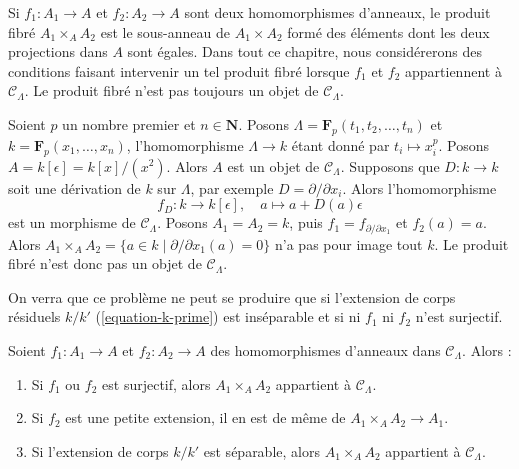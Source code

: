\noindent
Si $f_1: A_1 \to A$ et $f_2: A_2 \to A$ sont deux homomorphismes d'anneaux,
le produit fibré $A_1 \times_A A_2$ est le sous-anneau de $A_1 \times A_2$
formé des éléments dont les deux projections dans $A$ sont égales. Dans tout
ce chapitre, nous considérerons des conditions faisant intervenir un tel
produit fibré lorsque $f_1$ et $f_2$ appartiennent à
$\mathcal{C}_\Lambda$. Le produit fibré n'est pas toujours un objet de
$\mathcal{C}_\Lambda$.

\begin{example}
\label{example-fibre-product}
Soient $p$ un nombre premier et $n \in \mathbf{N}$.
Posons $\Lambda = \mathbf{F}_p(t_1, t_2, \ldots, t_n)$ et
$k = \mathbf{F}_p(x_1, \ldots, x_n)$, l'homomorphisme $\Lambda \to k$ étant
donné par $t_i \mapsto x_i^p$. Posons $A = k[\epsilon] = k[x]/(x^2)$.
Alors $A$ est un objet de $\mathcal{C}_\Lambda$. Supposons que
$D : k \to k$ soit une dérivation de $k$ sur $\Lambda$, par exemple
$D = \partial/\partial x_i$. Alors l'homomorphisme
$$
f_D : k \longrightarrow k[\epsilon], \quad
a \mapsto a + D(a)\epsilon
$$
est un morphisme de $\mathcal{C}_\Lambda$. Posons $A_1 = A_2 = k$, puis
$f_1 = f_{\partial/\partial x_1}$ et $f_2(a) = a$. Alors
$A_1 \times_A A_2 = \{a \in k \mid \partial/\partial x_1(a) = 0\}$
n'a pas pour image tout $k$. Le produit fibré n'est donc pas un objet de
$\mathcal{C}_\Lambda$.
\end{example}

\noindent
On verra que ce problème ne peut se produire que si l'extension de corps
résiduels $k/k'$ (\ref{equation-k-prime}) est inséparable et si ni $f_1$ ni
$f_2$ n'est surjectif.

\begin{lemma}
\label{lemma-fiber-product-CLambda}
Soient $f_1 : A_1 \to A$ et $f_2 : A_2 \to A$ des homomorphismes d'anneaux
dans $\mathcal{C}_\Lambda$. Alors :
\begin{enumerate}
\item Si $f_1$ ou $f_2$ est surjectif, alors
$A_1 \times_A A_2$ appartient à $\mathcal{C}_\Lambda$.
\item Si $f_2$ est une petite extension, il en est de même de
$A_1 \times_A A_2 \to A_1$.
\item Si l'extension de corps $k/k'$ est séparable, alors
$A_1 \times_A A_2$ appartient à $\mathcal{C}_\Lambda$.
\end{enumerate}
\end{lemma}

